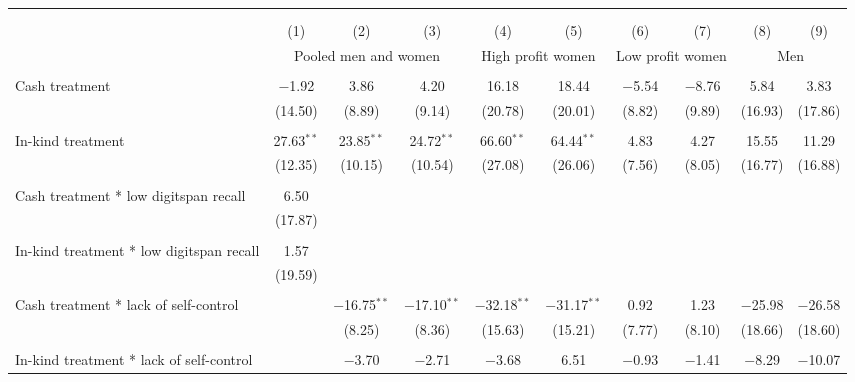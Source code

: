 
\begin{table}[!htbp] \centering 
  \caption{} 
  \label{} 
\begin{tabular}{@{\extracolsep{5pt}}lccccccccc} 
\\[-1.8ex]\hline 
\hline \\[-1.8ex] 
\\[-1.8ex] & (1) & (2) & (3) & (4) & (5) & (6) & (7) & (8) & (9)\\ 
 & \multicolumn{3}{c}{Pooled men and women} & \multicolumn{2}{c}{High profit women} & \multicolumn{2}{c}{Low profit women} & \multicolumn{2}{c}{Men} \\ 
\hline \\[-1.8ex] 
 Cash treatment & $-$1.92 & 3.86 & 4.20 & 16.18 & 18.44 & $-$5.54 & $-$8.76 & 5.84 & 3.83 \\ 
  & (14.50) & (8.89) & (9.14) & (20.78) & (20.01) & (8.82) & (9.89) & (16.93) & (17.86) \\ 
  & & & & & & & & & \\ 
 In-kind treatment & 27.63$^{**}$ & 23.85$^{**}$ & 24.72$^{**}$ & 66.60$^{**}$ & 64.44$^{**}$ & 4.83 & 4.27 & 15.55 & 11.29 \\ 
  & (12.35) & (10.15) & (10.54) & (27.08) & (26.06) & (7.56) & (8.05) & (16.77) & (16.88) \\ 
  & & & & & & & & & \\ 
 Cash treatment * low digitspan recall & 6.50 &  &  &  &  &  &  &  &  \\ 
  & (17.87) &  &  &  &  &  &  &  &  \\ 
  & & & & & & & & & \\ 
 In-kind treatment * low digitspan recall & 1.57 &  &  &  &  &  &  &  &  \\ 
  & (19.59) &  &  &  &  &  &  &  &  \\ 
  & & & & & & & & & \\ 
 Cash treatment * lack of self-control &  & $-$16.75$^{**}$ & $-$17.10$^{**}$ & $-$32.18$^{**}$ & $-$31.17$^{**}$ & 0.92 & 1.23 & $-$25.98 & $-$26.58 \\ 
  &  & (8.25) & (8.36) & (15.63) & (15.21) & (7.77) & (8.10) & (18.66) & (18.60) \\ 
  & & & & & & & & & \\ 
 In-kind treatment * lack of self-control &  & $-$3.70 & $-$2.71 & $-$3.68 & 6.51 & $-$0.93 & $-$1.41 & $-$8.29 & $-$10.07 \\ 

\end{tabular}
\end{table}
